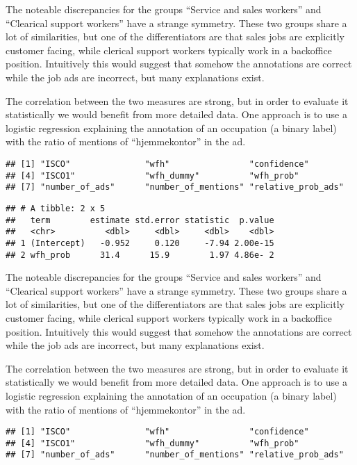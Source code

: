 \documentclass[11pt,]{article}
\begin{document}
The noteable discrepancies for the groups ``Service and sales workers''
and ``Clearical support workers'' have a strange symmetry. These two
groups share a lot of similarities, but one of the differentiators are
that sales jobs are explicitly customer facing, while clerical support
workers typically work in a backoffice position. Intuitively this would
suggest that somehow the annotations are correct while the job ads are
incorrect, but many explanations exist.

The correlation between the two measures are strong, but in order to
evaluate it statistically we would benefit from more detailed data. One
approach is to use a logistic regression explaining the annotation of an
occupation (a binary label) with the ratio of mentions of
``hjemmekontor'' in the ad.

\begin{verbatim}
## [1] "ISCO"               "wfh"                "confidence"        
## [4] "ISCO1"              "wfh_dummy"          "wfh_prob"          
## [7] "number_of_ads"      "number_of_mentions" "relative_prob_ads"
\end{verbatim}

\begin{verbatim}
## # A tibble: 2 x 5
##   term        estimate std.error statistic  p.value
##   <chr>          <dbl>     <dbl>     <dbl>    <dbl>
## 1 (Intercept)   -0.952     0.120     -7.94 2.00e-15
## 2 wfh_prob      31.4      15.9        1.97 4.86e- 2
\end{verbatim}

The noteable discrepancies for the groups ``Service and sales workers''
and ``Clearical support workers'' have a strange symmetry. These two
groups share a lot of similarities, but one of the differentiators are
that sales jobs are explicitly customer facing, while clerical support
workers typically work in a backoffice position. Intuitively this would
suggest that somehow the annotations are correct while the job ads are
incorrect, but many explanations exist.

The correlation between the two measures are strong, but in order to
evaluate it statistically we would benefit from more detailed data. One
approach is to use a logistic regression explaining the annotation of an
occupation (a binary label) with the ratio of mentions of
``hjemmekontor'' in the ad.

\begin{verbatim}
## [1] "ISCO"               "wfh"                "confidence"        
## [4] "ISCO1"              "wfh_dummy"          "wfh_prob"          
## [7] "number_of_ads"      "number_of_mentions" "relative_prob_ads"
\end{verbatim}
\end{document}
